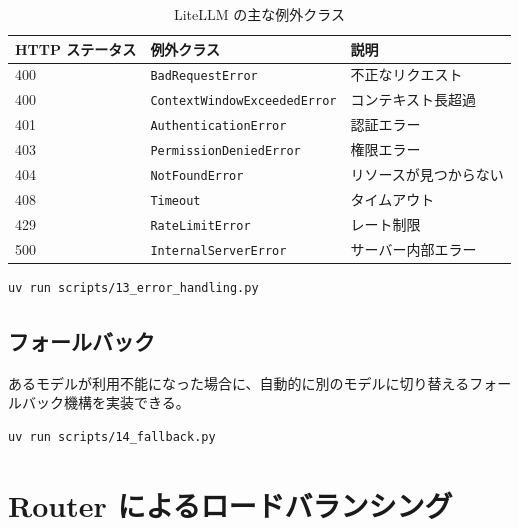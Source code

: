 \documentclass[a4paper,11pt]{ltjsarticle}
\newcommand{\code}[1]{\texttt{#1}}
\begin{document}
\begin{table}[htbp]
\centering
\caption{LiteLLM の主な例外クラス}
\label{tab:exceptions}
\begin{tabular}{lll}
\toprule
HTTP ステータス & 例外クラス & 説明 \\
\midrule
400 & \code{BadRequestError}              & 不正なリクエスト \\
400 & \code{ContextWindowExceededError}    & コンテキスト長超過 \\
401 & \code{AuthenticationError}           & 認証エラー \\
403 & \code{PermissionDeniedError}         & 権限エラー \\
404 & \code{NotFoundError}                 & リソースが見つからない \\
408 & \code{Timeout}                       & タイムアウト \\
429 & \code{RateLimitError}                & レート制限 \\
500 & \code{InternalServerError}           & サーバー内部エラー \\
\bottomrule
\end{tabular}
\end{table}



\begin{lstlisting}[style=bash]
uv run scripts/13_error_handling.py
\end{lstlisting}

\subsection{フォールバック}
\label{subsec:fallback}

あるモデルが利用不能になった場合に、自動的に別のモデルに切り替えるフォールバック機構を実装できる。



\begin{lstlisting}[style=bash]
uv run scripts/14_fallback.py
\end{lstlisting}


\section{Router によるロードバランシング}
\label{sec:router}
\end{document}
